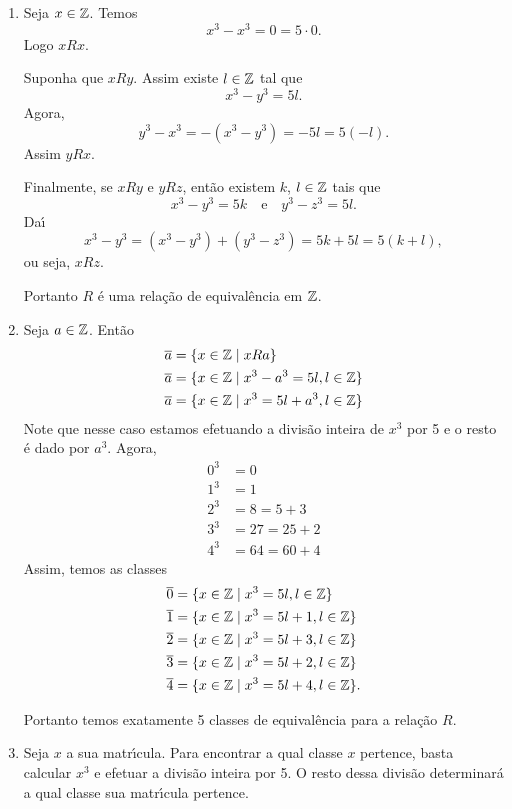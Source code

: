 \documentclass[12pt]{exam}
\begin{document}
	\begin{enumerate}[label={\roman*})]
		\item Seja $x \in \mathbb{Z}$. Temos
		\[
			x^3 - x^3 = 0 = 5\cdot 0.
		\]
		Logo $xRx$.

		Suponha que $xRy$. Assim existe $l \in \mathbb{Z}$ tal que
		\[
			x^3 - y^3 = 5l.
		\]
		Agora,
		\[
			y^3 - x^3 = -(x^3 - y^3) = -5l = 5(-l).
		\]
		Assim $yRx$.

		Finalmente, se $xRy$ e $yRz$, ent\~ao existem $k$, $l \in \mathbb{Z}$ tais que
		\[
			x^3 - y^3 = 5k \quad \mbox{e} \quad y^3 - z^3 = 5l.
		\]
		Da{\'\i}
		\[
			x^3 - y^3 = (x^3 - y^3) + (y^3 - z^3) = 5k + 5l = 5(k + l),
		\]
		ou seja, $xRz$.

		Portanto $R$ \'e uma rela\c{c}\~ao de equival\^encia em $\mathbb{Z}$.

		\item Seja $a \in \mathbb{Z}$. Ent\~ao
		\begin{align*}
			\overline{a} &= \{x \in \mathbb{Z} \mid xRa\} \\
			\overline{a} &= \{x \in \mathbb{Z} \mid x^3 - a^3 = 5l, l \in \mathbb{Z}\}\\
			\overline{a} &= \{x \in \mathbb{Z} \mid x^3 = 5l + a^3, l \in \mathbb{Z}\}
		\end{align*}
		Note que nesse caso estamos efetuando a divis\~ao inteira de $x^3$ por 5 e o resto \'e dado por $a^3$.
		Agora,
		\begin{align*}
			0^3 &= 0\\
			1^3 &= 1\\
			2^3 &= 8 = 5 + 3\\
			3^3 &= 27 = 25 + 2\\
			4^3 &= 64 = 60 + 4
		\end{align*}
		Assim,
		temos as classes
		\begin{align*}
			\overline{0} &= \{x \in \mathbb{Z} \mid x^3 = 5l, l \in \mathbb{Z}\}\\
			\overline{1} &= \{x \in \mathbb{Z} \mid x^3 = 5l + 1, l \in \mathbb{Z}\}\\
			\overline{2} &= \{x \in \mathbb{Z} \mid x^3 = 5l + 3, l \in \mathbb{Z}\}\\
			\overline{3} &= \{x \in \mathbb{Z} \mid x^3 = 5l + 2, l \in \mathbb{Z}\}\\
			\overline{4} &= \{x \in \mathbb{Z} \mid x^3 = 5l + 4, l \in \mathbb{Z}\}.\\
		\end{align*}

		Portanto temos exatamente 5 classes de equival\^encia para a rela\c{c}\~ao $R$.

		\item Seja $x$ a sua matr{\'\i}cula. Para encontrar a qual classe $x$ pertence, basta calcular $x^3$ e efetuar a divis\~ao inteira por 5. O resto dessa divis\~ao determinar\'a a qual classe sua matr{\'\i}cula pertence.
	\end{enumerate}
\end{document}
